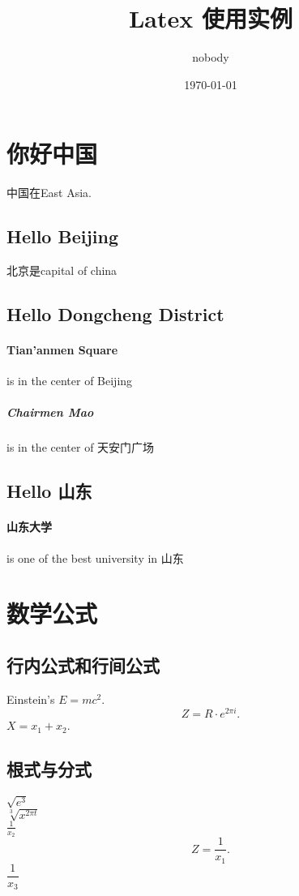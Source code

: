 \documentclass[12pt]{article}
\title{Latex 使用实例}
\author{nobody}
\date{\today}
\begin{document}
\maketitle
\section{你好中国}
中国在East Asia.
\subsection{Hello Beijing}
北京是capital of china
\subsection{Hello Dongcheng District}
\paragraph{Tian'anmen Square}
is in the center of Beijing
\subparagraph{Chairmen Mao}
is in the center of 天安门广场
\subsection{Hello 山东}
\paragraph{山东大学}is one of the best university in 山东

\section{数学公式}
\subsection{行内公式和行间公式}
Einstein's $E=mc^2$.
\begin{equation}
Z = R \cdot e^{2 \pi i}.
\end{equation} 
$X = x_1 + x_2$.

\subsection{根式与分式}
$\sqrt{e^3}$\\[5pt]
$\sqrt[3]{x^{2 \pi t}}$\\[5pt]
$\frac{1}{x_2}$
\begin{equation}
Z = \frac{1}{x_1}.
\end{equation}
$\dfrac{1}{x_3}$\\[5pt]
\end{document}

